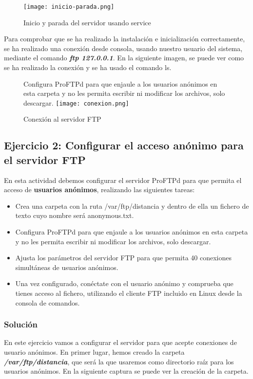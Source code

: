 \begin{figure}[H]
    \centering
    \texttt{[image: inicio-parada.png]}
    \caption{Inicio y parada del servidor usando service}
\end{figure}

Para comprobar que se ha realizado la instalación e inicialización correctamente, se ha realizado una conexión desde consola, usando nuestro usuario del sistema, mediante el comando \textbf{\textit{ftp 127.0.0.1}}. En la siguiente imagen, se puede ver como se ha realizado la conexión y se ha usado el comando ls.

\begin{figure}[H]Configura ProFTPd para que enjaule a los usuarios anónimos en esta carpeta y no les permita escribir ni modificar los archivos, solo descargar.
    \centering
    \texttt{[image: conexion.png]}
    \caption{Conexión al servidor FTP}
\end{figure}

\subsection{Ejercicio 2: Configurar el acceso anónimo para el servidor FTP}
En esta actividad debemos configurar el servidor ProFTPd para que permita el acceso de \textbf{usuarios anónimos}, realizando las siguientes tareas:

\begin{itemize}
    \item Crea una carpeta con la ruta /var/ftp/distancia y dentro de ella un fichero de texto cuyo nombre será anonymous.txt.
    \item Configura ProFTPd para que enjaule a los usuarios anónimos en esta carpeta y no les permita escribir ni modificar los archivos, solo descargar.
    \item Ajusta los parámetros del servidor FTP para que permita 40 conexiones simultáneas de usuarios anónimos.
    \item Una vez configurado, conéctate con el usuario anónimo y comprueba que tienes acceso al fichero, utilizando el cliente FTP incluido en Linux desde la consola de comandos.
\end{itemize}

\subsubsection{Solución}
En este ejercicio vamos a configurar el servidor para que acepte conexiones de usuario anónimos. En primer lugar, hemos creado la carpeta \textbf{\textit{/var/ftp/distancia}}, que será la que usaremos como directorio raíz para los usuarios anónimos. En la siguiente captura se puede ver la creación de la carpeta.

